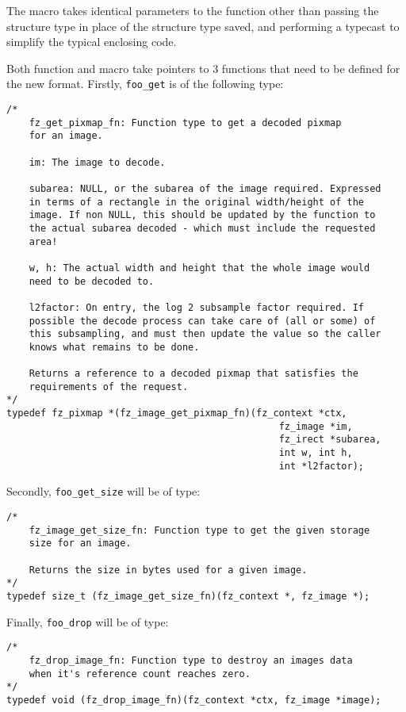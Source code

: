 \documentclass[oneside]{book}
\begin{document}
The macro takes identical parameters to the function other than passing the structure type in place of the structure type saved, and performing a typecast to simplify the typical enclosing code. 

Both function and macro take pointers to 3 functions that need to be defined for the new format. Firstly, \texttt{foo\_get} is of the following type:

\begin{lstlisting}
/*
	fz_get_pixmap_fn: Function type to get a decoded pixmap
	for an image.

	im: The image to decode.

	subarea: NULL, or the subarea of the image required. Expressed
	in terms of a rectangle in the original width/height of the
	image. If non NULL, this should be updated by the function to
	the actual subarea decoded - which must include the requested
	area!

	w, h: The actual width and height that the whole image would
	need to be decoded to.

	l2factor: On entry, the log 2 subsample factor required. If
	possible the decode process can take care of (all or some) of
	this subsampling, and must then update the value so the caller
	knows what remains to be done.

	Returns a reference to a decoded pixmap that satisfies the
	requirements of the request.
*/
typedef fz_pixmap *(fz_image_get_pixmap_fn)(fz_context *ctx,
												fz_image *im,
												fz_irect *subarea,
												int w, int h,
												int *l2factor);
\end{lstlisting}

Secondly, \texttt{foo\_get\_size} will be of type:

\begin{lstlisting}
/*
	fz_image_get_size_fn: Function type to get the given storage
	size for an image.

	Returns the size in bytes used for a given image.
*/
typedef size_t (fz_image_get_size_fn)(fz_context *, fz_image *);
\end{lstlisting}

Finally, \texttt{foo\_drop} will be of type:

\begin{lstlisting}
/*
	fz_drop_image_fn: Function type to destroy an images data
	when it's reference count reaches zero.
*/
typedef void (fz_drop_image_fn)(fz_context *ctx, fz_image *image);
\end{lstlisting}
\end{document}
